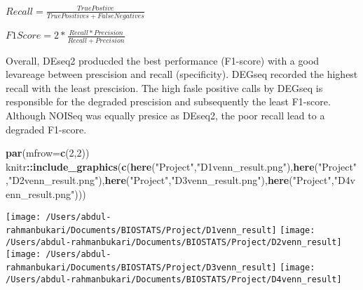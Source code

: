 \documentclass[]{article}
\newenvironment{Shaded}{\begin{snugshade}}{\end{snugshade}}
\newcommand{\DataTypeTok}[1]{\textcolor[rgb]{0.13,0.29,0.53}{#1}}
\newcommand{\DecValTok}[1]{\textcolor[rgb]{0.00,0.00,0.81}{#1}}
\newcommand{\KeywordTok}[1]{\textcolor[rgb]{0.13,0.29,0.53}{\textbf{#1}}}
\newcommand{\NormalTok}[1]{#1}
\newcommand{\OperatorTok}[1]{\textcolor[rgb]{0.81,0.36,0.00}{\textbf{#1}}}
\newcommand{\StringTok}[1]{\textcolor[rgb]{0.31,0.60,0.02}{#1}}
\begin{document}
\(Recall= \frac{True Postive}{True Positives + False Negatives}\)

\(F1 Score = 2*\frac{Recall * Precision}{Recall + Precision}\)

Overall, DEseq2 producded the best performance (F1-score) with a good
levareage between prescision and recall (specificity). DEGseq recorded
the highest recall with the least prescision. The high fasle positive
calls by DEGseq is responsible for the degraded prescision and
subsequently the least F1-score. Although NOISeq was equally presice as
DEseq2, the poor recall lead to a degraded F1-score.

\begin{Shaded}
\begin{Highlighting}[]
\KeywordTok{par}\NormalTok{(}\DataTypeTok{mfrow=}\KeywordTok{c}\NormalTok{(}\DecValTok{2}\NormalTok{,}\DecValTok{2}\NormalTok{))}
\NormalTok{knitr}\OperatorTok{::}\KeywordTok{include_graphics}\NormalTok{(}\KeywordTok{c}\NormalTok{(}\KeywordTok{here}\NormalTok{(}\StringTok{"Project"}\NormalTok{,}\StringTok{"D1venn_result.png"}\NormalTok{),}\KeywordTok{here}\NormalTok{(}\StringTok{"Project"}\NormalTok{,}\StringTok{"D2venn_result.png"}\NormalTok{),}\KeywordTok{here}\NormalTok{(}\StringTok{"Project"}\NormalTok{,}\StringTok{"D3venn_result.png"}\NormalTok{),}\KeywordTok{here}\NormalTok{(}\StringTok{"Project"}\NormalTok{,}\StringTok{"D4venn_result.png"}\NormalTok{)))}
\end{Highlighting}
\end{Shaded}

\texttt{[image: /Users/abdul-rahmanbukari/Documents/BIOSTATS/Project/D1venn\_result]}
\texttt{[image: /Users/abdul-rahmanbukari/Documents/BIOSTATS/Project/D2venn\_result]}
\texttt{[image: /Users/abdul-rahmanbukari/Documents/BIOSTATS/Project/D3venn\_result]}
\texttt{[image: /Users/abdul-rahmanbukari/Documents/BIOSTATS/Project/D4venn\_result]}
\end{document}
